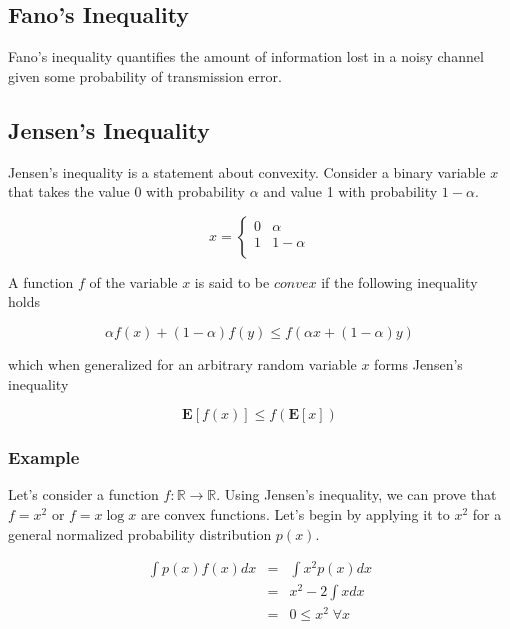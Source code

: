 \documentclass[a4paper,11pt]{book}
\begin{document}
\subsection{Fano's Inequality}

Fano's inequality quantifies the amount of information lost in a noisy channel given some probability of transmission error. 

\subsection{Jensen's Inequality}

Jensen's inequality is a statement about convexity. Consider a binary variable $x$ that takes the value 0 with probability $\alpha$ and value 1 with probability $1-\alpha$.

\[x= \begin{cases} 
      0 & \alpha \\
      1 & 1-\alpha \\
   \end{cases}
\]

A function $f$ of the variable $x$ is said to be $\textit{convex}$ if the following inequality holds

\begin{equation*}
\alpha f(x) + (1-\alpha)f(y) \leq f(\alpha x + (1-\alpha)y)
\end{equation*}

which when generalized for an arbitrary random variable $x$ forms Jensen's inequality

\begin{equation}
\mathbf{E}[f(x)] \leq f(\mathbf{E}[x])
\end{equation}


\subsubsection{Example}

Let's consider a function $f: \mathbb{R} \rightarrow \mathbb{R}$. Using Jensen's inequality, we can prove that $f=x^{2}$ or $f=x\log x$ are convex functions. Let's begin by applying it to $x^{2}$ for a general normalized probability distribution $p(x)$.

\begin{eqnarray*}
\int p(x)f(x)dx & = & \int x^{2}p(x)dx\\
&=& x^{2} - 2\int xdx\\
&=& 0 \leq x^{2} \; \forall x
\end{eqnarray*}
\end{document}
